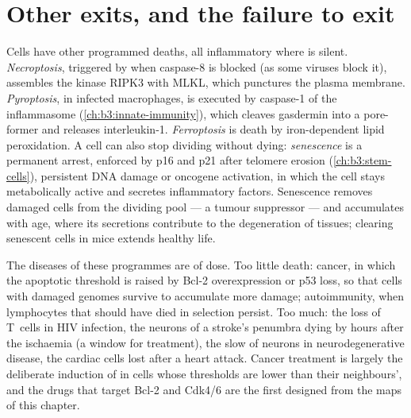 \section{Other exits, and the failure to exit}

\begin{definition}\label{def:b3:cell-cycle-apoptosis:other}
Cells have other programmed deaths, all inflammatory where 
is silent. \emph{Necroptosis}, triggered by  when
caspase-8 is blocked (as some viruses block it), assembles the kinase
RIPK3 with MLKL, which punctures the plasma membrane. \emph{Pyroptosis},
in infected macrophages, is executed by caspase-1 of the inflammasome
(\cref{ch:b3:innate-immunity}), which cleaves gasdermin into a
pore-former and releases interleukin-1. \emph{Ferroptosis} is death by
iron-dependent lipid peroxidation. A cell can also stop dividing
without dying: \emph{senescence} is a permanent arrest, enforced by p16
and p21 after telomere erosion (\cref{ch:b3:stem-cells}), persistent
DNA damage or oncogene activation, in which the cell stays metabolically
active and secretes inflammatory factors. Senescence removes damaged
cells from the dividing pool --- a tumour suppressor --- and accumulates
with age, where its secretions contribute to the degeneration of
tissues; clearing senescent cells in mice extends healthy life.
\end{definition}

\begin{remark}\label{rem:b3:cell-cycle-apoptosis:disease}
The diseases of these programmes are of dose. Too little death:
cancer, in which the apoptotic threshold is raised by Bcl-2
overexpression or p53 loss, so that cells with damaged genomes survive
to accumulate more damage; autoimmunity, when lymphocytes that should
have died in selection persist. Too much: the loss of T~cells in HIV
infection, the neurons of a stroke's penumbra dying by  hours
after the ischaemia (a window for treatment), the slow  of
neurons in neurodegenerative disease, the cardiac cells lost after a
heart attack. Cancer treatment is largely the deliberate induction of
 in cells whose thresholds are lower than their neighbours',
and the drugs that target Bcl-2 and Cdk4/6 are the first designed
from the maps of this chapter.
\end{remark}

